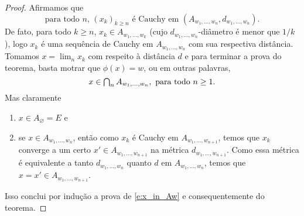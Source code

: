 \begin{proof}
  Afirmamos que
  \begin{equation}
    \text{para todo $n$, $(x_k)_{k \geq n}$ é Cauchy em $(A_{w_1, \dots, w_n}, d_{w_1, \dots, w_n})$.}
  \end{equation}
  De fato, para todo $k \geq n$, $x_k \in A_{w_1, \dots, w_{k}}$ (cujo $d_{w_1, \dots, w_{n}}$-diâmetro é menor que $1/k$), logo $x_k$ é uma sequência de Cauchy em $A_{w_1, \dots, w_n}$ com sua respectiva distância.
  Tomamos $x = \lim_n x_k$ com respeito à distância $d$ e para terminar a prova do teorema, basta motrar que $\phi(x) = w$, ou em outras palavras,
  \begin{equation}
    \label{e:x_in_Aw}
    x \in \operatorname*{{\textstyle \bigcap}}\nolimits_n A_{w_1, \dots, w_n}, \text{ para todo $n \geq 1$.}
  \end{equation}
  Mas claramente
  \begin{enumerate}[\quad a)]
  \item $x \in A_\varnothing = E$ e
  \item se $x \in A_{w_1, \dots, w_n}$, então como $x_k$ é Cauchy em $A_{w_1, \dots, w_{n+1}}$, temos que $x_k$ converge a um certo $x' \in A_{w_1, \dots, w_{n+1}}$ na métrica $d_{w_1, \dots, w_{n+1}}$.
    Como essa métrica é equivalente a tanto $d_{w_1, \dots, w_n}$ quanto $d$ em $A_{w_1, \dots, w_n}$, temos que $x = x' \in A_{w_1, \dots, w_{n+1}}$.
  \end{enumerate}
  Isso conclui por indução a prova de \eqref{e:x_in_Aw} e consequentemente do teorema.
\end{proof}

